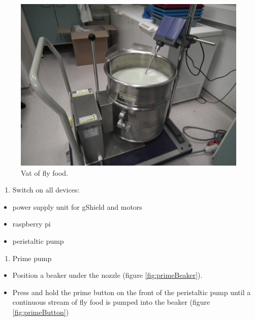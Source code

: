 \documentclass[]{book}
\providecommand{\tightlist}{%
  \setlength{\itemsep}{0pt}\setlength{\parskip}{0pt}}
\theoremstyle{definition}
\theoremstyle{definition}
\theoremstyle{remark}
\begin{document}
\begin{figure}

{\centering \includegraphics[width=0.75\linewidth]{images/pump7} 

}

\caption{Vat of fly food.}\label{fig:flyFoodVat}
\end{figure}

\begin{enumerate}
\def\labelenumi{\arabic{enumi}.}
\setcounter{enumi}{3}
\tightlist
\item
  Switch on all devices:
\end{enumerate}

\begin{itemize}
\tightlist
\item
  power supply unit for gShield and motors
\item
  raspberry pi
\item
  peristaltic pump
\end{itemize}

\begin{enumerate}
\def\labelenumi{\arabic{enumi}.}
\setcounter{enumi}{4}
\tightlist
\item
  Prime pump
\end{enumerate}

\begin{itemize}
\tightlist
\item
  Position a beaker under the nozzle (figure \ref{fig:primeBeaker}).
\item
  Press and hold the prime button on the front of the peristaltic pump
  until a continuous stream of fly food is pumped into the beaker
  (figure \ref{fig:primeButton})
\end{itemize}
\end{document}
